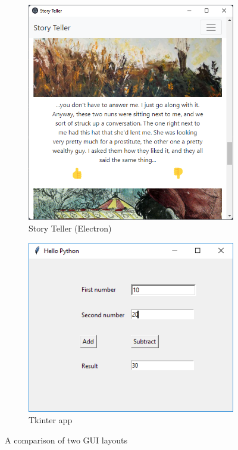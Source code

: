 \documentclass[12pt]{report}
\begin{document}
\begin{figure}[ht]
  \captionsetup[subfigure]{labelformat=empty}
  \centering
  \begin{subfigure}{.5\textwidth}
    \centering
    \includegraphics[width=.8\linewidth]{img/electron_window_example.png}
    \caption{Story Teller (Electron)}
    \label{fig:electron}
  \end{subfigure}%
  \begin{subfigure}{.5\textwidth}
    \centering
    \includegraphics[width=.8\linewidth]{img/tkinter_window_example.png}
    \caption{Tkinter app}
    \label{fig:tkinter}
  \end{subfigure}
  \caption{A comparison of two GUI layouts}
  \label{fig:comparison_tk_electron}
\end{figure}
\end{document}
